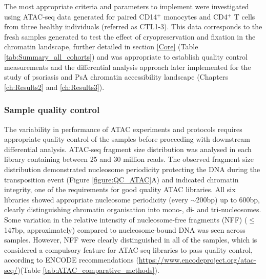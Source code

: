 The most appropriate criteria and parameters to implement were investigated using ATAC-seq data generated for paired CD14$^+$ monocytes and CD4$^+$ T cells from three healthy individuals (referred as CTL1-3). This data corresponds to the fresh samples generated to test the effect of cryopreservation and fixation in the chromatin landscape, further detailed in section \ref{Core} (Table \ref{tab:Summary_all_cohorts}) and was appropriate to establish quality control measurements and the differential analysis approach later implemented for the study of psoriasis and PsA chromatin accessibility landscape (Chapters \ref{ch:Results2} and \ref{ch:Results3}). 




\subsubsection{Sample quality control}
The variability in performance of ATAC experiments and protocols requires appropriate quality control of the samples before proceeding with downstream differential analysis. ATAC-seq fragment size distribution was analysed in each library containing between 25 and 30 million reads. The observed fragment size distribution demonstrated nucleosome periodicity protecting the DNA during the transposition event (Figure \ref{figure:QC_ATAC}A) and indicated chromatin integrity, one of the requirements for good quality ATAC libraries. All six libraries showed appropriate nucleosome periodicity (every $\sim$200bp) up to 600bp, clearly distinguishing chromatin organisation into mono-, di- and tri-nucleosomes. Some variation in the relative intensity of nucleosome-free fragments (NFF) ($\leq$147bp, approximately) compared to nucleosome-bound DNA was seen across samples. However, NFF were clearly distinguished in all of the samples, which is considered a compulsory feature for ATAC-seq libraries to pass quality control, according to ENCODE recommendations (\url{https://www.encodeproject.org/atac-seq/})(Table \ref{tab:ATAC_comparative_methods}).

